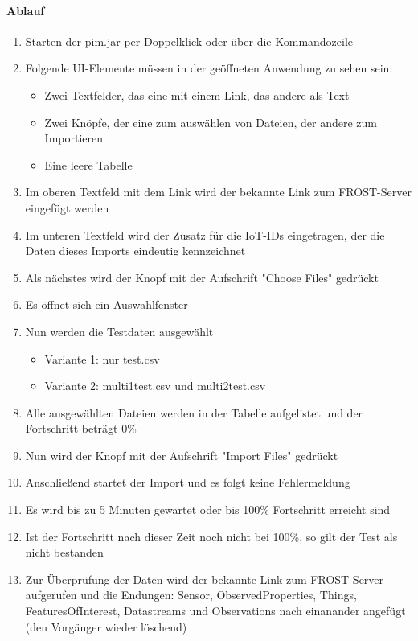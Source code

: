 \documentclass{article}
\begin{document}
\paragraph{Ablauf}
\begin{enumerate}
\item Starten der pim.jar per Doppelklick oder über die Kommandozeile
\item Folgende UI-Elemente m\"ussen in der ge\"offneten Anwendung zu sehen sein:
\begin{itemize}
\item Zwei Textfelder, das eine mit einem Link, das andere als Text
\item Zwei Kn\"opfe, der eine zum ausw\"ahlen von Dateien, der andere zum Importieren
\item Eine leere Tabelle
\end{itemize}
\item Im oberen Textfeld mit dem Link wird der bekannte Link zum FROST-Server eingefügt werden
\item Im unteren Textfeld wird der Zusatz f\"ur die IoT-IDs eingetragen, der die Daten dieses Imports eindeutig kennzeichnet
\item Als n\"achstes wird der Knopf mit der Aufschrift "Choose Files" gedrückt
\item Es \"offnet sich ein Auswahlfenster
\item Nun werden die Testdaten ausgew\"ahlt
\begin{itemize}
\item Variante 1: nur test.csv
\item Variante 2: multi1test.csv und multi2test.csv
\end{itemize}
\item Alle ausgew\"ahlten Dateien werden in der Tabelle aufgelistet und der Fortschritt betr\"agt 0\%
\item Nun wird der Knopf mit der Aufschrift "Import Files" gedr\"uckt
\item Anschlie\ss end startet der Import und es folgt keine Fehlermeldung
\item Es wird bis zu 5 Minuten gewartet oder bis 100\% Fortschritt erreicht sind
\item Ist der Fortschritt nach dieser Zeit noch nicht bei 100\%, so gilt der Test als nicht bestanden
\item Zur \"Uberpr\"ufung der Daten wird der bekannte Link zum FROST-Server aufgerufen und die Endungen: Sensor, ObservedProperties, Things, FeaturesOfInterest, Datastreams und Observations nach einanander angefügt (den Vorgänger wieder löschend)

\end{enumerate}
\end{document}
